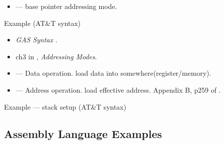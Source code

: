 \begin{itemize}
\item {} --- base pointer addressing mode.
  \begin{center}
  \end{center}
\end{itemize}

\begin{frame}
  \begin{block}{Example \scriptsize{(AT\&T syntax)}}
    \mode<beamer>{
      \texttt{[image: asm]}
    }
  \end{block}
\end{frame}

\begin{itemize}
\item \emph{GAS Syntax} \cite{wikibooks-gas}.
\item ch3 in \cite{bartlett2009programming}, \emph{Addressing Modes}.
\item {} --- Data operation. load data into somewhere(register/memory).
\item {} --- Address operation. load effective address. Appendix B, p259 of \cite{bartlett2009programming}.
\end{itemize}

\begin{frame}
  \begin{block}{Example --- stack setup \scriptsize{(AT\&T syntax)}}
     
  \end{block}
\end{frame}

\subsection{Assembly Language Examples}
\label{sec:assembly-lang-exampl}

